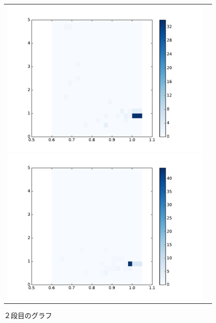 \documentclass[a4paper,10pt,onecolumn,oneside,openany]{jsbook}
\begin{document}
 
\begin{figure}[h]
 \begin{tabular}{cc}
 	\begin{minipage}[t]{0.45\hsize}
	 \centering
	 \includegraphics[keepaspectratio, scale = 0.35]{colormap_maze_block_1.pdf}
	 \caption{１段目のグラフ}
	 \label{first_maze_block_color}
	\end{minipage}
        \begin{minipage}[t]{0.45\hsize}
	 \centering
	 \includegraphics[keepaspectratio, scale = 0.35]{colormap_maze_block_2.pdf}
	 \caption{２段目のグラフ}
	 \label{second_maze_block_color}
	\end{minipage}
 \end{tabular}
 \end{figure}
\end{document}
